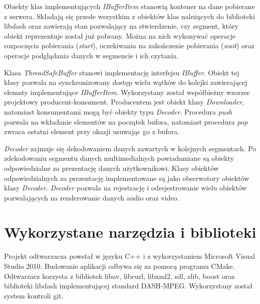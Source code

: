 Obiekty klas implementujących \textit{IBufferItem} stanowią kontener na dane pobierane z serwera. Składają się przede wszystkim z obiektów klas należących do biblioteki libdash oraz zawierają stan pozwalający na stwierdzenie, czy segment, który obiekt reprezentuje został już pobrany. Można na nich wykonywać operacje rozpoczęcia pobierania (\textit{start}), oczekiwania na zakończenie pobierania (\textit{wait}) oraz operacje podglądania danych w segmencie i ich czytania.

Klasa \textit{ThreadSafeBuffer} stanowi implementację interfejsu \textit{IBuffer}. Obiekt tej klasy pozwala na synchronizowany dostęp wielu wątków do kolejki zawierającej elemnty implementujące \textit{IBufferItem}. Wykorzystany został współbieżny wzorzec projektowy producent-konsument. Producentem jest obiekt klasy \textit{Downloader}, natomiast konsumentami mogą być obiekty typu \textit{Decoder}. Procedura \textit{push} pozwala na wkładanie elementów na początek bufora, natomiast procedura \textit{pop} zwraca ostatni element przy okazji usuwając go z bufora.

\textit{Decoder} zajmuje się dekodowaniem danych zawartych w kolejnych segmentach. Po zdekodowaniu segmentu danych multimedialnych powiadamiane są obiekty odpowiedzialne za prezentację danych użytkownikowi. Klasy obiektów odpowiedzialnych za prezentację implementowane są jako obserwatory obiektów klasy \textit{Decoder}. \textit{Decoder} pozwala na rejestrację i odrejestrowanie wielu obiektów pozwalających na renderowanie danych audio oraz video.

\section{Wykorzystane narzędzia i biblioteki}

Projekt odtwarzacza powstał w języku C++ i z wykorzystaniem Microsoft Visual Studio 2010. Budowanie aplikacji odbywa się za pomocą programu CMake. Odtwarzacz korzysta z bibliotek libav, libcurl, libxml2, sdl, zlib, boost oraz biblioteki libdash implementującej standard DASH-MPEG. Wykorzystany został system kontroli git.

